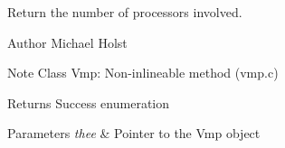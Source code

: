 Return the number of processors involved. 

\begin{DoxyAuthor}{Author}
Michael Holst 
\end{DoxyAuthor}
\begin{DoxyNote}{Note}
Class Vmp\+: Non-\/inlineable method (vmp.\+c) 
\end{DoxyNote}
\begin{DoxyReturn}{Returns}
Success enumeration 
\end{DoxyReturn}

\begin{DoxyParams}{Parameters}
{\em thee} & Pointer to the Vmp object \\
\hline
\end{DoxyParams}
